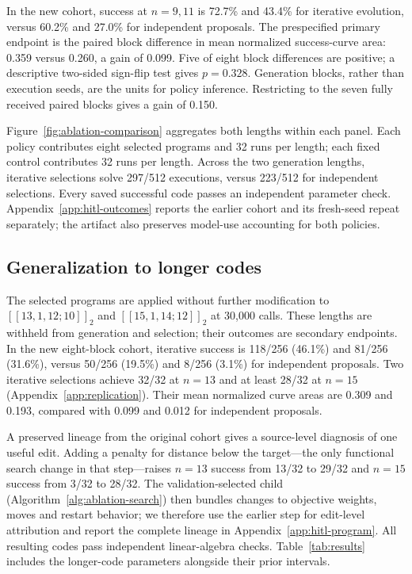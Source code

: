 \documentclass{article}
\begin{document}


In the new cohort, success at $n=9,11$ is 72.7\% and 43.4\% for
iterative evolution, versus 60.2\% and 27.0\% for independent proposals.
The prespecified primary endpoint is the paired block difference in
mean normalized success-curve area: 0.359 versus 0.260, a gain of 0.099.
Five of eight block differences are positive; a descriptive two-sided
sign-flip test gives $p=0.328$. Generation blocks, rather than execution
seeds, are the units for policy inference. Restricting to the seven
fully received paired blocks gives a gain of 0.150.

Figure~\ref{fig:ablation-comparison} aggregates both lengths within each
panel. Each policy contributes eight selected programs and 32 runs per
length; each fixed control contributes 32 runs per length. Across the
two generation lengths, iterative selections solve 297/512 executions,
versus 223/512 for independent selections. Every saved successful code
passes an independent parameter check. Appendix~\ref{app:hitl-outcomes}
reports the earlier cohort and its fresh-seed repeat separately; the
artifact also preserves model-use accounting for both policies.

\subsection{Generalization to longer codes}\label{sec:longer-codes}
The selected programs are applied without further modification to
$[[13,1,12;10]]_2$ and $[[15,1,14;12]]_2$ at 30,000 calls.
These lengths are withheld from generation and selection; their outcomes
are secondary endpoints. In the new eight-block cohort, iterative
success is 118/256 (46.1\%) and 81/256 (31.6\%), versus 50/256
(19.5\%) and 8/256 (3.1\%) for independent proposals. Two iterative
selections achieve 32/32 at $n=13$ and at least 28/32 at $n=15$
(Appendix~\ref{app:replication}).
Their mean normalized curve areas are 0.309 and 0.193, compared with
0.099 and 0.012 for independent proposals.

A preserved lineage from the original cohort gives a source-level
diagnosis of one useful edit. Adding a penalty for distance below the
target---the only functional search change in that step---raises
$n=13$ success from 13/32 to 29/32 and $n=15$ success from 3/32 to
28/32. The validation-selected child (Algorithm~\ref{alg:ablation-search})
then bundles changes to objective weights, moves and restart behavior;
we therefore use the earlier step for edit-level attribution and report
the complete lineage in Appendix~\ref{app:hitl-program}. All resulting
codes pass independent linear-algebra checks. Table~\ref{tab:results}
includes the longer-code parameters alongside their prior intervals.
\end{document}

